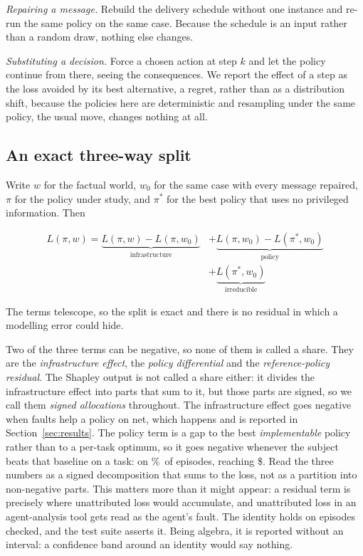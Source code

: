 \documentclass[conference]{IEEEtran}
\begin{document}
\emph{Repairing a message.} Rebuild the delivery schedule without one instance
and re-run the same policy on the same case. Because the schedule is an input
rather than a random draw, nothing else changes.

\emph{Substituting a decision.} Force a chosen action at step $k$ and let the
policy continue from there, seeing the consequences. We report the effect of a
step as the loss avoided by its best alternative, a regret, rather than as a
distribution shift, because the policies here are deterministic and resampling
under the same policy, the usual move, changes nothing at all.

\subsection{An exact three-way split}
\label{sec:split}

Write $w$ for the factual world, $w_0$ for the same case with every message
repaired, $\pi$ for the policy under study, and $\pi^{*}$ for the best policy
that uses no privileged information. Then

\begin{equation}
\begin{split}
L(\pi, w) = \underbrace{L(\pi,w) - L(\pi,w_0)}_{\text{infrastructure}}
          &+ \underbrace{L(\pi,w_0) - L(\pi^{*},w_0)}_{\text{policy}}\\
          &+ \underbrace{L(\pi^{*},w_0)}_{\text{irreducible}}
\end{split}
\end{equation}

The terms telescope, so the split is exact and there is no residual in which a
modelling error could hide.

Two of the three terms can be negative, so none of them is called a share.
They are the \emph{infrastructure effect}, the \emph{policy differential} and
the \emph{reference-policy residual}. The Shapley output is not called a share
either: it divides the infrastructure effect into parts that sum to it, but
those parts are signed, so we call them \emph{signed allocations} throughout. The infrastructure effect goes negative when faults help
a policy on net, which happens and is reported in Section~\ref{sec:results}. The policy term is a gap
to the best \emph{implementable} policy rather than to a per-task optimum, so it
goes negative whenever the subject beats that baseline on a task: on
\negPolicyRate\%\ of episodes, reaching \$\negPolicyWorst. Read the three
numbers as a signed decomposition that sums to the loss, not as a partition into
non-negative parts. This matters more than it might appear: a residual
term is precisely where unattributed loss would accumulate, and unattributed
loss in an agent-analysis tool gets read as the agent's fault. The identity holds on \decompExact{} episodes checked, and the test suite
asserts it. Being algebra, it is reported without an
interval: a confidence band around an identity would say nothing.
\end{document}
